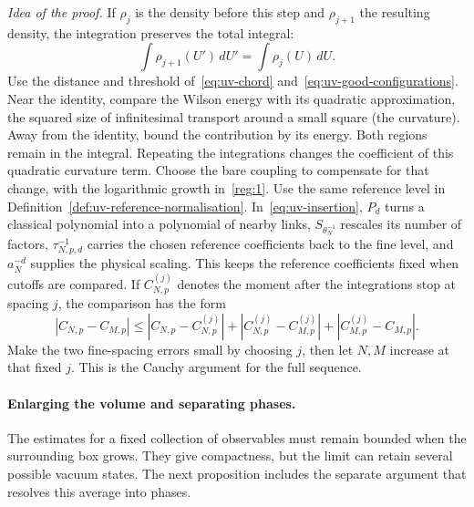 \emph{Idea of the proof.}
If $\rho_j$ is the density before this step and $\rho_{j+1}$ the resulting density, the integration preserves the total integral:
\begin{equation*}
 \int \rho_{j+1}(U')\,dU'=\int \rho_j(U)\,dU.
\end{equation*}
Use the distance and threshold of~\eqref{eq:uv-chord} and~\eqref{eq:uv-good-configurations}. Near the identity, compare the Wilson energy with its quadratic approximation, the squared size of infinitesimal transport around a small square (the curvature). Away from the identity, bound the contribution by its energy. Both regions remain in the integral.
Repeating the integrations changes the coefficient of this quadratic curvature term. Choose the bare coupling to compensate for that change, with the logarithmic growth in~\ref{reg:1}.
Use the same reference level in Definition~\ref{def:uv-reference-normalisation}. In~\eqref{eq:uv-insertion}, $P_d$ turns a classical polynomial into a polynomial of nearby links, $S_{\theta_N^{-1}}$ rescales its number of factors, $\tau_{N,p,d}^{-1}$ carries the chosen reference coefficients back to the fine level, and $a_N^{-d}$ supplies the physical scaling. This keeps the reference coefficients fixed when cutoffs are compared.
If $C_{N,p}^{(j)}$ denotes the moment after the integrations stop at spacing $j$, the comparison has the form
\begin{equation*}
 |C_{N,p}-C_{M,p}|\le |C_{N,p}-C_{N,p}^{(j)}|+|C_{N,p}^{(j)}-C_{M,p}^{(j)}|+|C_{M,p}^{(j)}-C_{M,p}|.
\end{equation*}
Make the two fine-spacing errors small by choosing $j$, then let $N,M$ increase at that fixed $j$. This is the Cauchy argument for the full sequence.


\paragraph{Enlarging the volume and separating phases.}
The estimates for a fixed collection of observables must remain bounded when the surrounding box grows.
They give compactness, but the limit can retain several possible vacuum states.
The next proposition includes the separate argument that resolves this average into phases.

